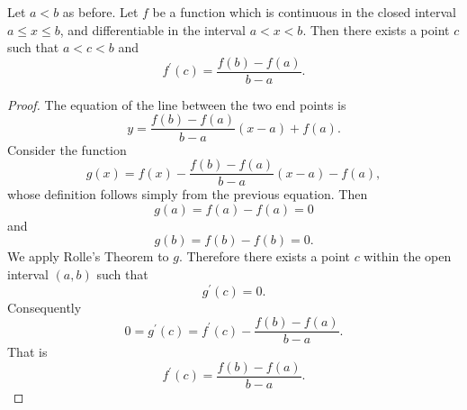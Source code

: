 \begin{theorem} %
  Let $a < b$ as before. Let $f$ be a function which is continuous in the closed interval $a \le x \le b$, and differentiable in the interval $a < x < b$. Then there exists a point $c$ such that $a < c < b$ and
  \[f^\prime(c) = \frac{f(b) - f(a)}{b - a}.\]
\end{theorem}

\begin{proof}
  The equation of the line between the two end points is
  \[y = \frac{f(b) - f(a)}{b - a}(x - a) + f(a).\]
  Consider the function
  \[g(x) = f(x) - \frac{f(b) - f(a)}{b - a}(x - a) - f(a),\]
  whose definition follows simply from the previous equation. Then
  \[g(a) = f(a) - f(a) = 0\]
  and
  \[g(b) = f(b) - f(b) = 0.\]
  We apply Rolle's Theorem to $g$. Therefore there exists a point $c$ within the open interval $(a, b)$ such that
  \[g^\prime(c) = 0.\]
  Consequently
  \[0 = g^\prime(c) = f^\prime(c) - \frac{f(b) - f(a)}{b - a}.\]
  That is
  \[f^\prime(c) = \frac{f(b) - f(a)}{b - a}.\]
\end{proof}
